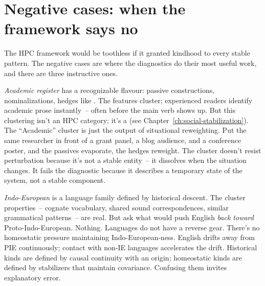 \section{Negative cases: when the framework says no}
\label{sec:14:negative}

The HPC framework would be toothless if it granted kindhood to every stable pattern. The negative cases are where the diagnostics do their most useful work, and there are three instructive ones.

\emph{Academic register} has a recognizable flavour: passive constructions, nominalizations, hedges like . The features cluster; experienced readers identify academic prose instantly~-- often before the main verb shows up. But this clustering isn't an HPC category; it's a  (see Chapter~\ref{ch:social-stabilization}). The \enquote{Academic} cluster is just the output of situational reweighting. Put the same researcher in front of a grant panel, a blog audience, and a conference poster, and the passives evaporate, the hedges reweight. The cluster doesn't resist perturbation because it's not a stable entity~-- it dissolves when the situation changes. It fails the diagnostic because it describes a temporary state of the system, not a stable component.

\emph{Indo-European} is a language family defined by historical descent. The cluster properties~-- cognate vocabulary, shared sound correspondences, similar grammatical patterns~-- are real. But ask what would push English \emph{back toward} Proto-Indo-European. Nothing. Languages do not have a reverse gear. There's no homeostatic pressure maintaining Indo-European-ness. English drifts away from PIE continuously; contact with non-IE languages accelerates the drift. Historical kinds are defined by causal continuity with an origin; homeostatic kinds are defined by stabilizers that maintain covariance. Confusing them invites explanatory error.

